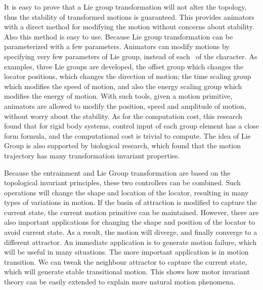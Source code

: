 It is easy to prove that a Lie group transformation will not alter the topology, thus the stability of transformed motions is guaranteed. 
This provides animators with a direct method for modifying the motion without concerns about stability.  
Also this method is easy to use. 
Because Lie group transformation can be parameterized with a few parameters. 
Animators can modify motions by specifying very few parameters of Lie group, instead of each \dof\ of the character. 
As examples, three Lie groups are developed, the offset group which  changes the locator positions, which changes the direction of motion; the time scaling group which modifies the speed of motion, and also the energy scaling group which modifies the energy of motion. With such tools, given a motion primitive, animators are allowed to modify the position, speed and amplitude of motion, without worry about the stability. 
As for the computation cost, this research found that for rigid body systems, control input of each group element has a close form formula, and the computational cost is trivial to compute. 
The idea of Lie Group is also supported by biological research, which found that the motion trajectory has many transformation invariant properties.


Because the {\cpg} entrainment and Lie Group transformation are based on the topological invariant principles, these two controllers can be combined.
Such operations will change the shape and location of the locator, resulting in many types of variations in motion. 
If the basin of attraction is modified to capture the current state, the current motion primitive can be maintained. 
However, there are also important applications for changing the shape and position of the locator to avoid current state. 
As a result, the motion will diverge, and finally converge to a different attractor. 
An immediate application is to generate motion failure, which will be useful in many situations. 
The more important application is in motion transition. 
We can tweak the neighbour attractor to capture the current state, which will generate stable transitional motion. 
This shows how motor invariant theory can be easily extended to explain more natural motion phenomena.

